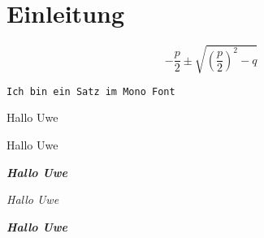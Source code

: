 \documentclass[parskip=half,fontsize=12pt,ngerman]{scrartcl}
\begin{document}
\section{Einleitung}

\blindtext[3]

\[
- \frac{p}{2} \pm \sqrt{ \left( \frac{p}{2}\right)^2 -q  }
\]

\texttt{Ich bin ein Satz im Mono Font}

{ Hallo Uwe}

{\comic Hallo Uwe}

{\comicb\bfseries\itshape Hallo Uwe}

{\comicb\itshape Hallo Uwe}

{\comicb\bfseries\itshape Hallo Uwe}
\end{document}
